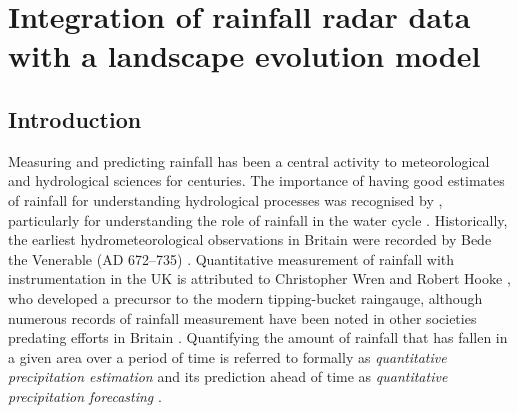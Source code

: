 \chapter{Integration of rainfall radar data with a landscape evolution model}
\label{chapter_metdata}

% 
%

\section{Introduction}

Measuring and predicting rainfall has been a central activity to meteorological and hydrological sciences for centuries. The importance of having good estimates of rainfall for understanding hydrological processes was recognised by \citet{perrault1674}, particularly for understanding the role of rainfall in the water cycle \citep{biswas1970history}. Historically, the earliest hydrometeorological observations in Britain were recorded by Bede the Venerable (AD 672--735) \citep{mcculloch1993history}. Quantitative measurement of rainfall with instrumentation in the UK is attributed to Christopher Wren and Robert Hooke \citep{biswas1970history}, who developed a precursor to the modern tipping-bucket raingauge, although numerous records of rainfall measurement have been noted in other societies predating efforts in Britain \citep{strangeways2010history}. Quantifying the amount of rainfall that has fallen in a given area over a period of time is referred to formally as \textit{quantitative precipitation estimation} \citep{fabry2015radar} and its prediction ahead of time as \textit{quantitative precipitation forecasting} \citep{golding2000quantitative,browning2003quantitative}.

